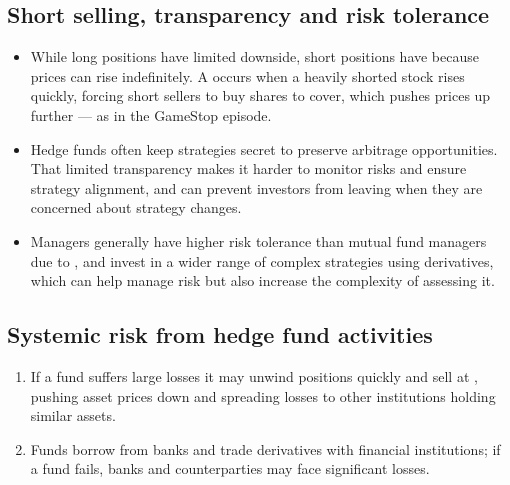 \subsection{Short selling, transparency and risk tolerance}

\begin{itemize}
\item {} While long positions have limited downside, short
positions have  because prices can rise
indefinitely. A  occurs when a heavily shorted stock rises
quickly, forcing short sellers to buy shares to cover, which pushes prices up
further --- as in the GameStop episode.
\item {} Hedge funds often keep strategies secret to preserve
arbitrage opportunities. That limited transparency makes it harder to monitor
risks and ensure strategy alignment, and  can prevent investors from leaving when they are concerned about
strategy changes.
\item {} Managers generally have higher risk tolerance than
mutual fund managers due to , and invest in a wider
range of complex strategies using derivatives, which can help manage risk but also
increase the complexity of assessing it.
\end{itemize}


\subsection{Systemic risk from hedge fund activities}

\begin{enumerate}
\item {} If a fund suffers large losses
it may unwind positions quickly and sell at , pushing asset
prices down and spreading losses to other institutions holding similar assets.
\item {} Funds borrow from banks and trade
derivatives with financial institutions; if a fund fails, banks and counterparties
may face significant losses.
\end{enumerate}

